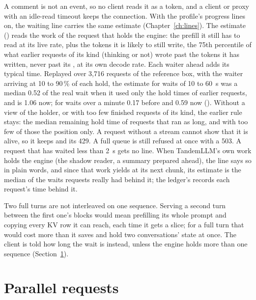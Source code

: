A comment is not an event, so no client reads it as a token, and a client or proxy with an idle-read timeout keeps the connection. With the profile's progress lines on, the waiting line carries the same estimate (Chapter~\ref{ch:lines}). The estimate () reads the work of the request that holds the engine: the prefill it still has to read at its live rate, plus the tokens it is likely to still write, the 75th percentile of what earlier requests of its kind (thinking or not) wrote past the tokens it has written, never past its , at its own decode rate. Each waiter ahead adds its typical time. Replayed over 3,716 requests of the reference box, with the waiter arriving at 10 to 90\,\% of each hold, the estimate for waits of 10 to 60~s was a median 0.52 of the real wait when it used only the hold times of earlier requests, and is 1.06 now; for waits over a minute 0.17 before and 0.59 now (\measured). Without a view of the holder, or with too few finished requests of its kind, the earlier rule stays: the median remaining hold time of requests that ran as long, and with too few of those the position only. A request without a stream cannot show that it is alive, so it keeps  and its 429. A full queue is still refused at once with a 503. A request that has waited less than 2~s gets no line. When TandemLLM's own work holds the engine (the shadow reader, a summary prepared ahead), the line says so in plain words, and since that work yields at its next chunk, its estimate is the median of the waits requests really had behind it; the ledger's  records each request's time behind it.

Two full turns are not interleaved on one sequence. Serving a second turn between the first one's blocks would mean prefilling its whole prompt and copying every KV row it can reach, each time it gets a slice; for a full turn that would cost more than it saves and hold two conversations' state at once. The client is told how long the wait is instead, unless the engine holds more than one sequence (Section~\ref{sec:parallel-requests}).

\section{Parallel requests}\label{sec:parallel-requests}


